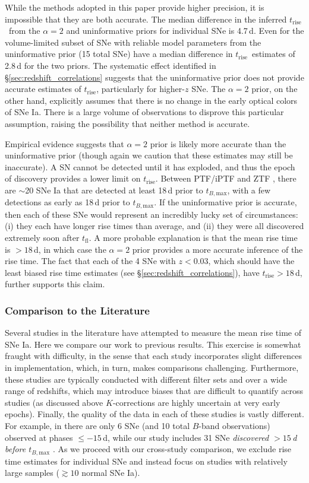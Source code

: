 \documentclass[twocolumn]{./aastex63}
\newcommand{\tfl}{$t_\mathrm{fl}$}
\newcommand{\trise}{$t_\mathrm{rise}$}
\newcommand{\tbmax}{$t_{B,\mathrm{max}}$}
\begin{document}
While the methods adopted in this paper provide higher precision, it is
impossible that they are both accurate. The median difference in the inferred
\trise\ from the $\alpha = 2$ and uninformative priors for individual SNe is
4.7\,d. Even for the volume-limited subset of SNe with reliable model parameters
from the uninformative prior (15 total SNe) have a median difference in \trise\
estimates of 2.8\,d for the two priors. The systematic effect identified in
\S\ref{sec:redshift_correlations} suggests that the uninformative prior does not
provide accurate estimates of \trise, particularly for higher-$z$ SNe. The
$\alpha = 2$ prior, on the other hand, explicitly assumes that there is no
change in the early optical colors of SNe Ia. There is a large volume of
observations to disprove this particular assumption, raising the possibility
that neither method is accurate.

Empirical evidence suggests that $\alpha = 2$ prior is likely more accurate than
the uninformative prior (though again we caution that these estimates may still
be inaccurate). A SN cannot be detected until it has exploded, and thus the
epoch of discovery provides a lower limit on \trise. Between PTF/iPTF
\citep{Papadogiannakis19} and ZTF \citep{Yao19}, there are $\sim$20 SNe Ia that
are detected at least 18\,d prior to \tbmax, with a few detections as early as
18\,d prior to \tbmax. If the uninformative prior is accurate, then each of
these SNe would represent an incredibly lucky set of circumstances: (i) they
each have longer rise times than average, and (ii) they were all discovered
extremely soon after \tfl. A more probable explanation is that the mean rise
time is $> 18$\,d, in which case the $\alpha = 2$ prior provides a more accurate
inference of the rise time. The fact that each of the 4 SNe with $z < 0.03$,
which should have the least biased rise time estimates (see
\S\ref{sec:redshift_correlations}), have \trise$ > 18$\,d, further supports this
claim.

\subsubsection{Comparison to the Literature}

Several studies in the literature have attempted to measure the mean rise time
of SNe Ia. Here we compare our work to previous results. This exercise is
somewhat fraught with difficulty, in the sense that each study incorporates
slight differences in implementation, which, in turn, makes comparisons
challenging. Furthermore, these studies are typically conducted with different
filter sets and over a wide range of redshifts, which may introduce biases
that are difficult to quantify across studies (as discussed above
$K$-corrections are highly uncertain at very early epochs). Finally, the
quality of the data in each of these studies is vastly different. For example,
in \citet{Riess99a} there are only 6 SNe (and 10 total $B$-band observations)
observed at phases $\le -15$\,d, while our study includes 31 SNe
\textit{discovered $> 15$\,d before \tbmax} \citep{Yao19}. As we proceed with
our cross-study comparison, we exclude rise time estimates for individual SNe
and instead focus on studies with relatively large samples ($\gtrsim 10$
normal SNe Ia).
\end{document}
